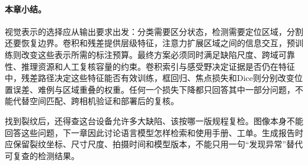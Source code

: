 \paragraph{本章小结。}
视觉表示的选择应从输出要求出发：分类需要区分状态，检测需要定位区域，分割还要恢复边界。卷积和残差提供层级特征，注意力扩展区域之间的信息交互，预训练则改变这些表示所需的标注预算。最终方案必须同时满足缺陷尺度、跨域可靠性、推理资源和人工复核容量的约束。卷积索引与感受野决定证据是否仍在特征中，残差路径决定这些特征能否有效训练，框回归、焦点损失和Dice则分别改变位置误差、难例与区域重叠的权重。任何一个损失下降都只回答其中一部分问题，不能代替空间匹配、跨相机验证和部署后的复核。

找到裂纹后，还得查这台设备允许多大缺陷、该按哪一版规程复检。图像本身不能回答这些问题，下一章因此讨论语言模型怎样检索和使用手册、工单。生成报告时应保留裂纹坐标、尺寸尺度、拍摄时间和模型版本，不能只用一句“发现异常”替代可复查的检测结果。
